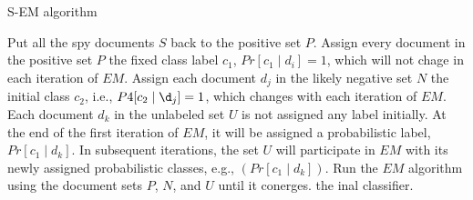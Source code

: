 \begin{algorithm}[htb]
\caption{S-EM algorithm}
\label{alg:sem}
\begin{algorithmic}[1]
    \STATE Put all the spy documents $S$ back to the positive set $P$.
    \STATE Assign every document in the positive set $P$ the fixed class label $c_1$, $Pr[c_1 \mid d_i] = 1$, which will not chage in each iteration of $EM$.
    \STATE Assign each document $d_j$ in the likely negative set $N$ the initial class $c_2$, i.e., $P4[c_2 \mid \d_j] = 1$, which changes with each iteration of $EM$.
    \STATE Each document $d_k$ in the unlabeled set $U$ is not assigned any label initially. At the end of the first iteration of $EM$, it will be assigned a probabilistic label, $Pr[c_1 \mid d_k]$. In subsequent iterations, the set $U$ will participate in $EM$ with its newly assigned probabilistic classes, e.g., $(Pr[c_1 \mid d_k])$.
    \STATE Run the $EM$ algorithm using the document sets $P$, $N$, and $U$ until it conerges.
    \RETURN the inal classifier.
\end{algorithmic}
\end{algorithm}

